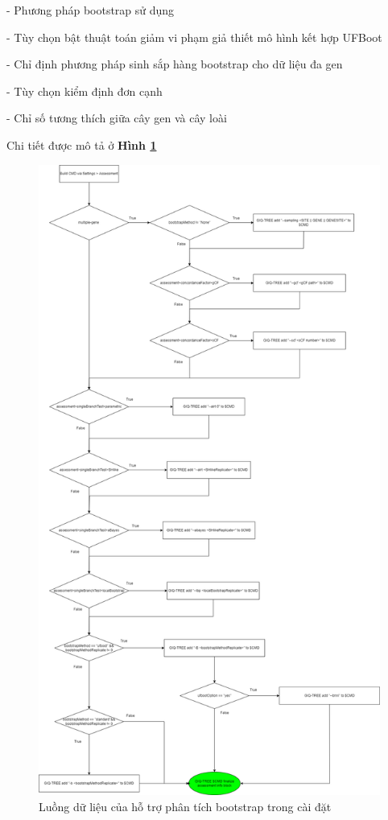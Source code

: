\documentclass[12pt]{report}
\begin{document}
- Phương pháp bootstrap sử dụng

- Tùy chọn bật thuật toán giảm vi phạm giả thiết mô hình kết hợp UFBoot

- Chỉ định phương pháp sinh sắp hàng bootstrap cho dữ liệu đa gen

- Tùy chọn kiểm định đơn cạnh

- Chỉ số tương thích giữa cây gen và cây loài

Chi tiết được mô tả ở  \textbf{Hình \ref{fig:image4.11}}

\begin{figure}[h]
	\centering
	\includegraphics[scale=0.28]{Image/4.11.png}
	\caption{Luồng dữ liệu của hỗ trợ phân tích bootstrap trong cài đặt }
	\label{fig:image4.11}
\end{figure}
\end{document}
